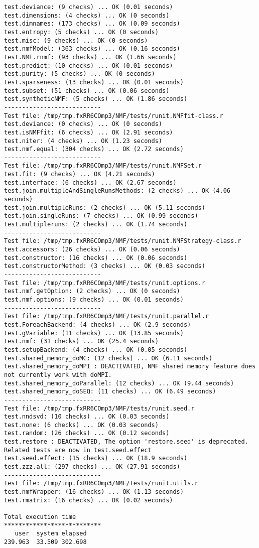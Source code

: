 \documentclass[10pt]{article}
\begin{document}
\begin{verbatim}
test.deviance: (9 checks) ... OK (0.01 seconds)
test.dimensions: (4 checks) ... OK (0 seconds)
test.dimnames: (173 checks) ... OK (0.09 seconds)
test.entropy: (5 checks) ... OK (0 seconds)
test.misc: (9 checks) ... OK (0 seconds)
test.nmfModel: (363 checks) ... OK (0.16 seconds)
test.NMF.rnmf: (93 checks) ... OK (1.66 seconds)
test.predict: (10 checks) ... OK (0.01 seconds)
test.purity: (5 checks) ... OK (0 seconds)
test.sparseness: (13 checks) ... OK (0.01 seconds)
test.subset: (51 checks) ... OK (0.06 seconds)
test.syntheticNMF: (5 checks) ... OK (1.86 seconds)
--------------------------- 
Test file: /tmp/tmp.fxRR6COmp3/NMF/tests/runit.NMFfit-class.r 
test.deviance: (0 checks) ... OK (0 seconds)
test.isNMFfit: (6 checks) ... OK (2.91 seconds)
test.niter: (4 checks) ... OK (1.23 seconds)
test.nmf.equal: (304 checks) ... OK (2.72 seconds)
--------------------------- 
Test file: /tmp/tmp.fxRR6COmp3/NMF/tests/runit.NMFSet.r 
test.fit: (9 checks) ... OK (4.21 seconds)
test.interface: (6 checks) ... OK (2.67 seconds)
test.join.multipleAndSingleRunsMethods: (2 checks) ... OK (4.06 seconds)
test.join.multipleRuns: (2 checks) ... OK (5.11 seconds)
test.join.singleRuns: (7 checks) ... OK (0.99 seconds)
test.multipleruns: (2 checks) ... OK (1.74 seconds)
--------------------------- 
Test file: /tmp/tmp.fxRR6COmp3/NMF/tests/runit.NMFStrategy-class.r 
test.accessors: (26 checks) ... OK (0.06 seconds)
test.constructor: (16 checks) ... OK (0.06 seconds)
test.constructorMethod: (3 checks) ... OK (0.03 seconds)
--------------------------- 
Test file: /tmp/tmp.fxRR6COmp3/NMF/tests/runit.options.r 
test.nmf.getOption: (2 checks) ... OK (0 seconds)
test.nmf.options: (9 checks) ... OK (0.01 seconds)
--------------------------- 
Test file: /tmp/tmp.fxRR6COmp3/NMF/tests/runit.parallel.r 
test.ForeachBackend: (4 checks) ... OK (2.9 seconds)
test.gVariable: (11 checks) ... OK (13.85 seconds)
test.nmf: (31 checks) ... OK (25.4 seconds)
test.setupBackend: (4 checks) ... OK (0.05 seconds)
test.shared_memory_doMC: (12 checks) ... OK (6.11 seconds)
test.shared_memory_doMPI : DEACTIVATED, NMF shared memory feature does not currently work with doMPI.
test.shared_memory_doParallel: (12 checks) ... OK (9.44 seconds)
test.shared_memory_doSEQ: (11 checks) ... OK (6.49 seconds)
--------------------------- 
Test file: /tmp/tmp.fxRR6COmp3/NMF/tests/runit.seed.r 
test.nndsvd: (10 checks) ... OK (0.03 seconds)
test.none: (6 checks) ... OK (0.03 seconds)
test.random: (26 checks) ... OK (0.12 seconds)
test.restore : DEACTIVATED, The option 'restore.seed' is deprecated. Related tests are now in test.seed.effect
test.seed.effect: (15 checks) ... OK (18.9 seconds)
test.zzz.all: (297 checks) ... OK (27.91 seconds)
--------------------------- 
Test file: /tmp/tmp.fxRR6COmp3/NMF/tests/runit.utils.r 
test.nmfWrapper: (16 checks) ... OK (1.13 seconds)
test.rmatrix: (16 checks) ... OK (0.02 seconds)

Total execution time
***************************
   user  system elapsed 
239.963  33.509 302.698 

\end{verbatim}
\end{document}
